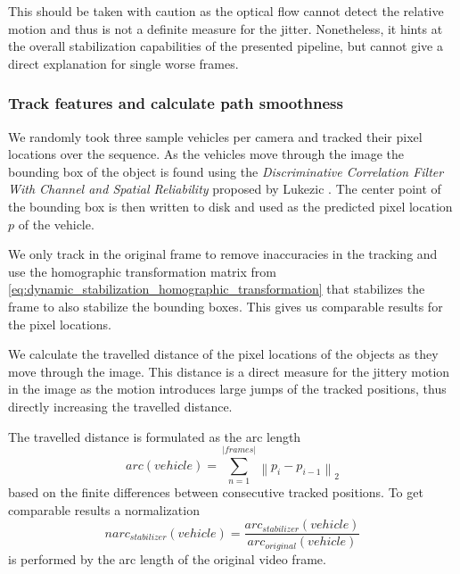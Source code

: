 This should be taken with caution as the optical flow cannot detect the relative motion and thus is not a definite measure for the jitter.
Nonetheless, it hints at the overall stabilization capabilities of the presented pipeline, but cannot give a direct explanation for single worse frames.



\subsubsection{Track features and calculate path smoothness}
We randomly took three sample vehicles per camera and tracked their pixel locations over the sequence.
As the vehicles move through the image the bounding box of the object is found using the \emph{Discriminative Correlation Filter With Channel and Spatial Reliability} proposed by Lukezic \etal{} \cite{Lukezic_2017_CVPR,opencv_library}.
The center point of the bounding box is then written to disk and used as the predicted pixel location $p$ of the vehicle.

We only track in the original frame to remove inaccuracies in the tracking and use the homographic transformation matrix from \autoref{eq:dynamic_stabilization_homographic_transformation} that stabilizes the frame to also stabilize the bounding boxes.
This gives us comparable results for the pixel locations. 

We calculate the travelled distance of the pixel locations of the objects as they move through the image. 
This distance is a direct measure for the jittery motion in the image as the motion introduces large jumps of the tracked positions, thus directly increasing the travelled distance.

The travelled distance is formulated as the arc length
\begin{equation}
    arc(vehicle) = \sum_{n = 1}^{\left\lvert frames \right\rvert } \left\lVert 
        p_{i} - p_{i-1}
    \right\rVert _2
\end{equation} 
based on the finite differences between consecutive tracked positions.
To get comparable results a normalization 
\begin{equation}
    narc_{stabilizer}(vehicle) = 
    \frac{arc_{stabilizer}(vehicle)}{arc_{original}(vehicle)}
\end{equation} 
is performed by the arc length of the original video frame.

